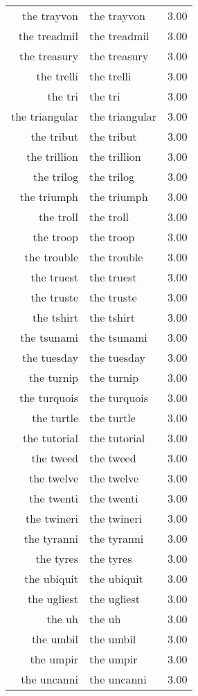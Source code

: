 \begin{table}[ht]
\begin{tabular}{rlr}
  the trayvon & the trayvon & 3.00 \\ 
  the treadmil & the treadmil & 3.00 \\ 
  the treasury & the treasury & 3.00 \\ 
  the trelli & the trelli & 3.00 \\ 
  the tri & the tri & 3.00 \\ 
  the triangular & the triangular & 3.00 \\ 
  the tribut & the tribut & 3.00 \\ 
  the trillion & the trillion & 3.00 \\ 
  the trilog & the trilog & 3.00 \\ 
  the triumph & the triumph & 3.00 \\ 
  the troll & the troll & 3.00 \\ 
  the troop & the troop & 3.00 \\ 
  the trouble & the trouble & 3.00 \\ 
  the truest & the truest & 3.00 \\ 
  the truste & the truste & 3.00 \\ 
  the tshirt & the tshirt & 3.00 \\ 
  the tsunami & the tsunami & 3.00 \\ 
  the tuesday & the tuesday & 3.00 \\ 
  the turnip & the turnip & 3.00 \\ 
  the turquois & the turquois & 3.00 \\ 
  the turtle & the turtle & 3.00 \\ 
  the tutorial & the tutorial & 3.00 \\ 
  the tweed & the tweed & 3.00 \\ 
  the twelve & the twelve & 3.00 \\ 
  the twenti & the twenti & 3.00 \\ 
  the twineri & the twineri & 3.00 \\ 
  the tyranni & the tyranni & 3.00 \\ 
  the tyres & the tyres & 3.00 \\ 
  the ubiquit & the ubiquit & 3.00 \\ 
  the ugliest & the ugliest & 3.00 \\ 
  the uh & the uh & 3.00 \\ 
  the umbil & the umbil & 3.00 \\ 
  the umpir & the umpir & 3.00 \\ 
  the uncanni & the uncanni & 3.00 \\ 

\end{tabular}
\end{table}
